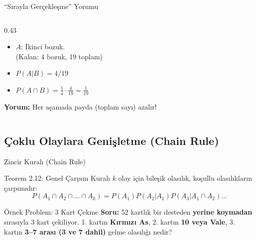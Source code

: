 \documentclass[light]{lutbeamer}
\begin{document}
\begin{frame}[fragile]{``Sırayla Gerçekleşme'' Yorumu}
\begin{columns}[T]
\begin{column}{0.43\textwidth}
\begin{itemize}
                \item $A$: İkinci bozuk. 
                \\ (Kalan: 4 bozuk, 19 toplam)
                
                \item $P(A|B) = 4/19$
                
                \item $P(A \cap B) = \frac{1}{4} \cdot \frac{4}{19} = \boxed{\frac{1}{19}}$
            \end{itemize}
            
            \vspace{0.2cm}
            \textbf{Yorum:} Her aşamada payda (toplam sayı) azalır!
        \end{column}
    \end{columns}
\end{frame}

\subsection{Çoklu Olaylara Genişletme (Chain Rule)}

\begin{frame}[fragile]{Zincir Kuralı (Chain Rule)}
    \begin{block}{Teorem 2.12: Genel Çarpım Kuralı}
        $k$ olay için bileşik olasılık, koşullu olasılıkların çarpımıdır:
        \[ P(A_1 \cap A_2 \cap \dots \cap A_k) = P(A_1) P(A_2|A_1) P(A_3|A_1 \cap A_2) \dots \]
    \end{block}
    
    \begin{exampleblock}{Örnek Problem: 3 Kart Çekme}
        \small
        \textbf{Soru:} 52 kartlık bir desteden \textbf{yerine koymadan} sırasıyla 3 kart çekiliyor.
        1. kartın \textbf{Kırmızı As}, 2. kartın \textbf{10 veya Vale}, 3. kartın \textbf{3--7 arası (3 ve 7 dahil)} gelme olasılığı nedir?
    \end{exampleblock}

\end{frame}
\end{document}
